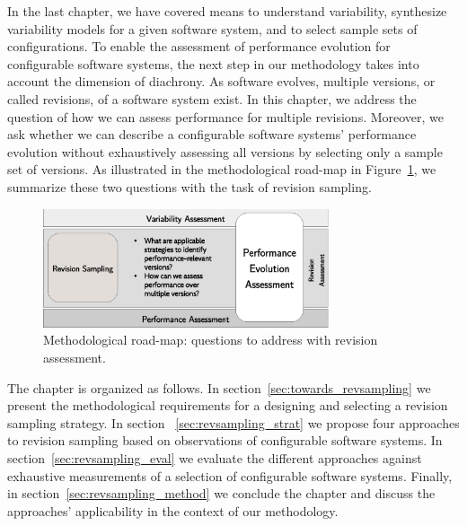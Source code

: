 In the last chapter, we have covered means to understand variability,
synthesize variability models for a given software system, and to select sample
sets of configurations. To enable the assessment of performance evolution for
configurable software systems, the next step in our methodology takes into
account the dimension of diachrony. As software evolves, multiple versions, or
called revisions, of a software system exist. In this chapter, we address the
question of how we can assess performance for multiple revisions. Moreover, we
ask whether we can describe a configurable software systems’ performance
evolution without exhaustively assessing all versions by selecting only a
sample set of versions. As illustrated in the methodological road-map in
Figure~\ref{fig:roadmap_2}, we summarize these two questions with the task of
revision sampling.

\begin{figure}[h!]
	\centering
	\includegraphics[width=0.75\textwidth]{images/process_revassesment.eps}
	\caption{Methodological road-map: questions to address with revision
	assessment.}
	\label{fig:roadmap_2}
\end{figure}

The chapter is organized as follows. In section~\ref{sec:towards_revsampling} we
present the methodological requirements for a designing and selecting a revision sampling
strategy. In section ~\ref{sec:revsampling_strat} we propose four approaches to
revision sampling based on observations of configurable software systems. In
section~\ref{sec:revsampling_eval} we evaluate the different approaches against
exhaustive measurements of a selection of configurable software systems.
Finally, in section~\ref{sec:revsampling_method} we conclude the chapter and
discuss the approaches' applicability in the context of our methodology.

